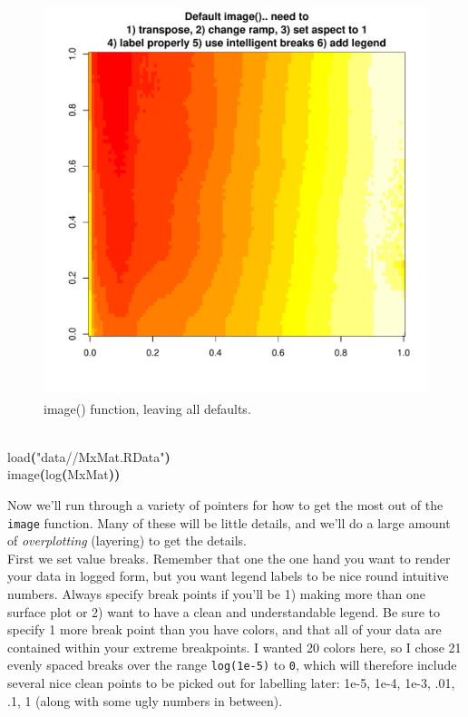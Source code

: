 \documentclass[a4paper]{article}
\newcommand{\hlfunctioncall}[1]{\textcolor[rgb]{1,0,0}{#1}}%
\newcommand{\hlstring}[1]{\textcolor[rgb]{0.6,0.6,1}{#1}}%
\newcommand{\hlkeyword}[1]{\textcolor[rgb]{0,0,0}{\textbf{#1}}}%
\newcommand{\hlsymbol}[1]{\textcolor[rgb]{0,0,0}{#1}}%
\newcommand{\hlprompt}[1]{\textcolor[rgb]{0,0,0}{#1}}%
\newcommand{\hlstd}[1]{\textcolor[rgb]{0,0,0}{#1}}%
\newenvironment{Houtput}{\raggedright}{%
%
}
\begin{document}
\begin{figure}[H]
\centering
\includegraphics[width=4.5in,height=4.5in]{figs/Image1.pdf}
\caption{image() function, leaving all defaults.}
\end{figure}

\begin{Houtput}
\hspace*{\fill}\\
\hlstd{}\ttfamily\noindent
\hlprompt{\usebox{\hlnormalsizeboxgreaterthan}{\ }}\hlfunctioncall{load}\hlkeyword{(}\hlstring{"data//MxMat.RData"}\hlkeyword{)}\mbox{}
\normalfont
\hspace*{\fill}\\
\hlstd{}\ttfamily\noindent
\hlprompt{\usebox{\hlnormalsizeboxgreaterthan}{\ }}\hlfunctioncall{image}\hlkeyword{(}\hlfunctioncall{log}\hlkeyword{(}\hlsymbol{MxMat}\hlkeyword{)}\hlkeyword{)}\mbox{}
\normalfont
\hspace*{\fill}\\
\hlstd{}
\end{Houtput}

Now we'll run through a variety of pointers for how to get the most out of the \texttt{image} function. Many of these will be little details, and we'll do a large amount of \textit{overplotting} (layering) to get the details.\\ 

First we set value breaks. Remember that one the one hand you want to render your data in logged form, but you want legend labels to be nice round intuitive numbers. Always specify break points if you'll be 1) making more than one surface plot or 2) want to have a clean and understandable legend. Be sure to specify 1 more break point than you have colors, and that all of your data are contained within your extreme breakpoints. I wanted 20 colors here, so I chose 21 evenly spaced breaks over the range \texttt{log(1e-5)} to \texttt{0}, which will therefore include several nice clean points to be picked out for labelling later: 1e-5, 1e-4, 1e-3, .01, .1, 1 (along with some ugly numbers in between).\\
\end{document}
